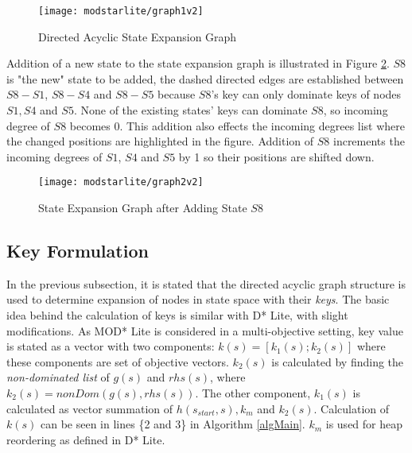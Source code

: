 \begin{figure}
\centering
\texttt{[image: modstarlite/graph1v2]}
\caption{Directed Acyclic State Expansion Graph}
\label{fig:graph1}
\end{figure}

Addition of a new state to the state expansion graph is illustrated in Figure \ref{fig:graph2}.  $S8$ is  "the new" state to be added, the dashed directed edges are established between $S8-S1$, $S8-S4$ and $S8-S5$ because $S8$'s key can only dominate keys of nodes $S1, S4$ and $S5$. None of the existing states' keys can dominate $S8$, so incoming degree of $S8$ becomes 0. This addition also effects the incoming degrees list where the changed positions are highlighted in the figure. Addition of $S8$ increments the incoming degrees of $S1$, $S4$ and $S5$ by 1 so their positions are shifted down.

\begin{figure}
\centering
\texttt{[image: modstarlite/graph2v2]}
\caption{State Expansion Graph after Adding State $S8$}
\label{fig:graph2}
\end{figure}

\subsection{Key Formulation}
In the previous subsection, it is stated that the directed acyclic graph structure is used to determine expansion of nodes in state space with their \textit{keys}. The basic idea behind the calculation of keys is similar with D* Lite, with slight modifications. As MOD* Lite is considered in a multi-objective setting, key value is stated as a vector with two components: $k(s) = [k_{1}(s);k_{2}(s)]$ where these components are set of objective vectors. $k_{2}(s)$ is calculated by finding the \textit{non-dominated list} of $g(s)$ and $rhs(s)$, where $k_{2}(s)= nonDom(g(s), rhs(s))$. The other component, $k_{1}(s)$  is calculated as vector summation of $h(s_{start}, s), k_{m}$ and $k_{2}(s)$. Calculation of $k(s)$ can be seen in lines \{2 and 3\} in Algorithm \ref{algMain}. $k_{m}$ is used for heap reordering as defined in  D* Lite.

